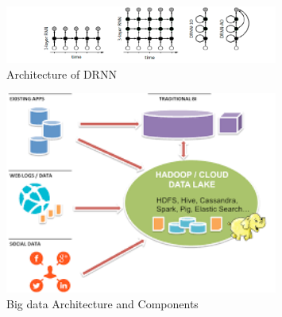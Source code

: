 \documentclass[sigconf]{acmart}
\begin{document}
\begin{figure}[htp]
    \includegraphics[width=0.8\textwidth]{images/images2.jpg}
    \caption{Architecture of DRNN}
    \label{fig:figure3}
\end{figure}

\begin{figure}[htp]
    \includegraphics[width=0.8\textwidth]{images/images3.jpg}
    \caption{Big data Architecture and Components \cite{www-google}}
    \label{fig:figure4}
\end{figure}
\end{document}

